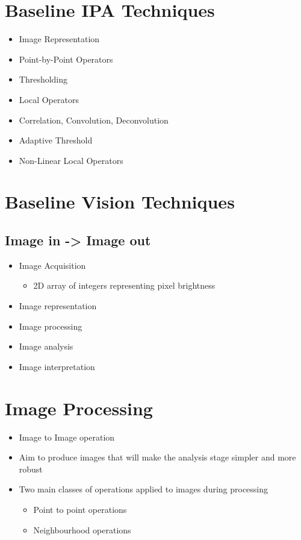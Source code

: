 \documentclass[a4paper]{article}
\begin{document}
	\section{Baseline IPA Techniques}
	\begin{itemize}
		\item Image Representation
		\item Point-by-Point Operators
		\item Thresholding
		\item Local Operators
		\item Correlation, Convolution, Deconvolution
		\item Adaptive Threshold
		\item Non-Linear Local Operators
	\end{itemize}
	\section{Baseline Vision Techniques}
	\subsection{Image in -> Image out}
	\begin{itemize}
		\item Image Acquisition
		\begin{itemize}
			\item 2D array of integers representing pixel brightness
		\end{itemize}
		\item Image representation
		\item Image processing
		\item Image analysis
		\item Image interpretation
	\end{itemize}
	\section{Image Processing}
	\begin{itemize}
		\item Image to Image operation
		\item Aim to produce images that will make the analysis stage simpler and more robust
		\item Two main classes of operations applied to images during processing
		\begin{itemize}
			\item Point to point operations
			\item Neighbourhood operations
		\end{itemize}
	\end{itemize}
\end{document}

